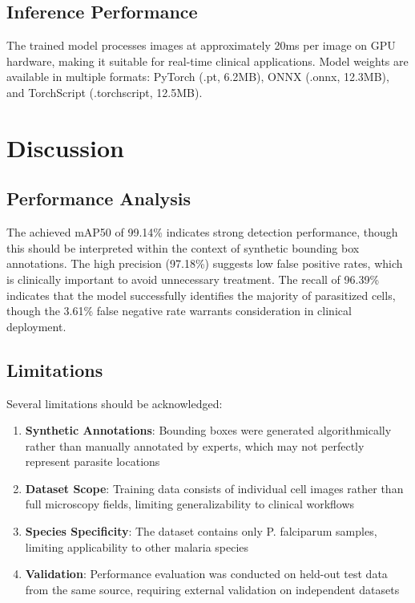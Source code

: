 \documentclass[10pt,twocolumn]{article}
\begin{document}
\subsection{Inference Performance}

The trained model processes images at approximately 20ms per image on GPU hardware, making it suitable for real-time clinical applications. Model weights are available in multiple formats: PyTorch (.pt, 6.2MB), ONNX (.onnx, 12.3MB), and TorchScript (.torchscript, 12.5MB).

\section{Discussion}

\subsection{Performance Analysis}

The achieved mAP50 of 99.14\% indicates strong detection performance, though this should be interpreted within the context of synthetic bounding box annotations. The high precision (97.18\%) suggests low false positive rates, which is clinically important to avoid unnecessary treatment. The recall of 96.39\% indicates that the model successfully identifies the majority of parasitized cells, though the 3.61\% false negative rate warrants consideration in clinical deployment.

\subsection{Limitations}

Several limitations should be acknowledged:

\begin{enumerate}
\item \textbf{Synthetic Annotations}: Bounding boxes were generated algorithmically rather than manually annotated by experts, which may not perfectly represent parasite locations
\item \textbf{Dataset Scope}: Training data consists of individual cell images rather than full microscopy fields, limiting generalizability to clinical workflows
\item \textbf{Species Specificity}: The dataset contains only P. falciparum samples, limiting applicability to other malaria species
\item \textbf{Validation}: Performance evaluation was conducted on held-out test data from the same source, requiring external validation on independent datasets
\end{enumerate}
\end{document}
